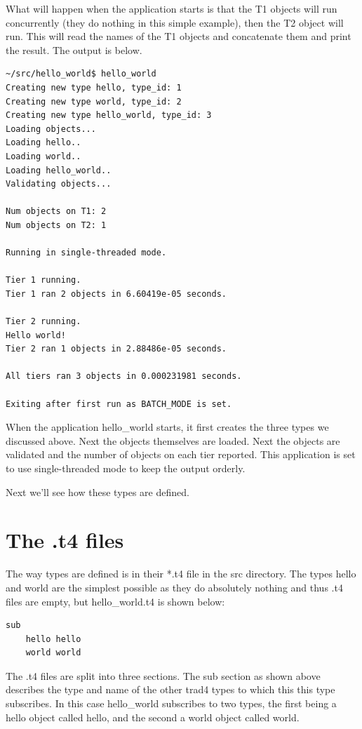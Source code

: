 \documentclass{report}
\begin{document}
What will happen when the application starts is that the T1 objects will run concurrently (they do nothing in this simple example), then the T2 object will run. This will read the names of the T1 objects and concatenate them and print the result. The output is below.


\begin{verbatim}
~/src/hello_world$ hello_world
Creating new type hello, type_id: 1
Creating new type world, type_id: 2
Creating new type hello_world, type_id: 3
Loading objects...
Loading hello..
Loading world..
Loading hello_world..
Validating objects...

Num objects on T1: 2
Num objects on T2: 1

Running in single-threaded mode.

Tier 1 running.
Tier 1 ran 2 objects in 6.60419e-05 seconds.

Tier 2 running.
Hello world!
Tier 2 ran 1 objects in 2.88486e-05 seconds.

All tiers ran 3 objects in 0.000231981 seconds.

Exiting after first run as BATCH_MODE is set.
\end{verbatim}

When the application hello_world starts, it first creates the three types we discussed above. Next the objects themselves are loaded. Next the objects are validated and the number of objects on each tier reported. This application is set to use single-threaded mode to keep the output orderly. 

Next we'll see how these types are defined.

\section{The .t4 files}

The way types are defined is in their *.t4 file in the src directory. The types hello and world are the simplest possible as they do absolutely nothing and thus .t4 files are empty, but hello_world.t4 is shown below:

\begin{verbatim}
sub
    hello hello
    world world
\end{verbatim}

The .t4 files are split into three sections. The sub section as shown above describes the type and name of the other trad4 types to which this this type subscribes. In this case hello_world subscribes to two types, the first being a hello object called hello, and the second a world object called world.
\end{document}
